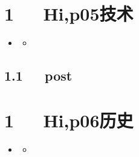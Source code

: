\documentclass[letterpaper,12pt,english]{sphinxmanual}
\begin{document}
\chapter{1   Hi,p05技术}
\label{\detokenize{p05_u6280_u672f/Hello_uff0cp05_u6280_u672f:hi-p05}}\label{\detokenize{p05_u6280_u672f/Hello_uff0cp05_u6280_u672f::doc}}
\begin{sphinxShadowBox}
\begin{itemize}
\item {} 
\label{\detokenize{p05_u6280_u672f/Hello_uff0cp05_u6280_u672f:id2}}{\hyperref[\detokenize{p05_u6280_u672f/Hello_uff0cp05_u6280_u672f:hi-p05}]{}}
\begin{itemize}
\item {} 
\label{\detokenize{p05_u6280_u672f/Hello_uff0cp05_u6280_u672f:id3}}{\hyperref[\detokenize{p05_u6280_u672f/Hello_uff0cp05_u6280_u672f:post}]{}}

\end{itemize}

\end{itemize}
\end{sphinxShadowBox}


\section{1.1   post}
\label{\detokenize{p05_u6280_u672f/Hello_uff0cp05_u6280_u672f:post}}

\chapter{1   Hi,p06历史}
\label{\detokenize{p06_u5386_u53f2/Hello_uff0cp06_u5386_u53f2:hi-p06}}\label{\detokenize{p06_u5386_u53f2/Hello_uff0cp06_u5386_u53f2::doc}}
\begin{sphinxShadowBox}
\begin{itemize}
\item {} 
\label{\detokenize{p06_u5386_u53f2/Hello_uff0cp06_u5386_u53f2:id2}}{\hyperref[\detokenize{p06_u5386_u53f2/Hello_uff0cp06_u5386_u53f2:hi-p06}]{}}
\begin{itemize}
\item {} 
\label{\detokenize{p06_u5386_u53f2/Hello_uff0cp06_u5386_u53f2:id3}}{\hyperref[\detokenize{p06_u5386_u53f2/Hello_uff0cp06_u5386_u53f2:post}]{}}

\end{itemize}

\end{itemize}
\end{sphinxShadowBox}
\end{document}

